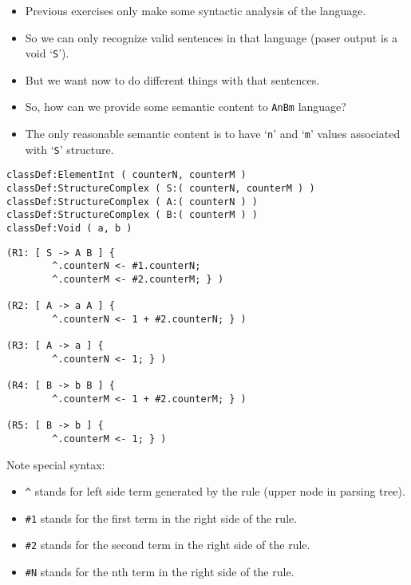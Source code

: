 \documentclass[11pt]{beamer}
\begin{document}
\begin{frame}[fragile]
\begin{itemize}
	\item Previous exercises only make some syntactic analysis of the language.
	\pause
	\item So we can only recognize valid sentences in that language (paser output is a void `\texttt{S}').
	\pause
	\item But we want now to do different things with that sentences.
	\pause
	\item So, how can we provide some semantic content to \texttt{AnBm} language?
	\pause
	\item The only reasonable semantic content is to have `\texttt{n}' and `\texttt{m}' values associated with `\texttt{S}' structure.
\end{itemize}
\footnotesize
\begin{lstlisting}[language=lekta]
classDef:ElementInt ( counterN, counterM )
classDef:StructureComplex ( S:( counterN, counterM ) )
classDef:StructureComplex ( A:( counterN ) )
classDef:StructureComplex ( B:( counterM ) )
classDef:Void ( a, b )
\end{lstlisting}
\end{frame}

\begin{frame}[fragile]
\scriptsize
\begin{lstlisting}[language=lekta]
(R1: [ S -> A B ] {
		^.counterN <- #1.counterN;
		^.counterM <- #2.counterM; } )

(R2: [ A -> a A ] {
		^.counterN <- 1 + #2.counterN; } )

(R3: [ A -> a ] {
		^.counterN <- 1; } )

(R4: [ B -> b B ] {
		^.counterM <- 1 + #2.counterM; } )

(R5: [ B -> b ] {
		^.counterM <- 1; } )
\end{lstlisting}
\footnotesize
Note special syntax:
\begin{itemize}
	\item \texttt{\^{}} stands for left side term generated by the rule (upper node in parsing tree).
	\item \texttt{\#1} stands for the first term in the right side of the rule.
	\item \texttt{\#2} stands for the second term in the right side of the rule.
	\item \texttt{\#N} stands for the nth term in the right side of the rule.
\end{itemize}
\end{frame}
\end{document}
